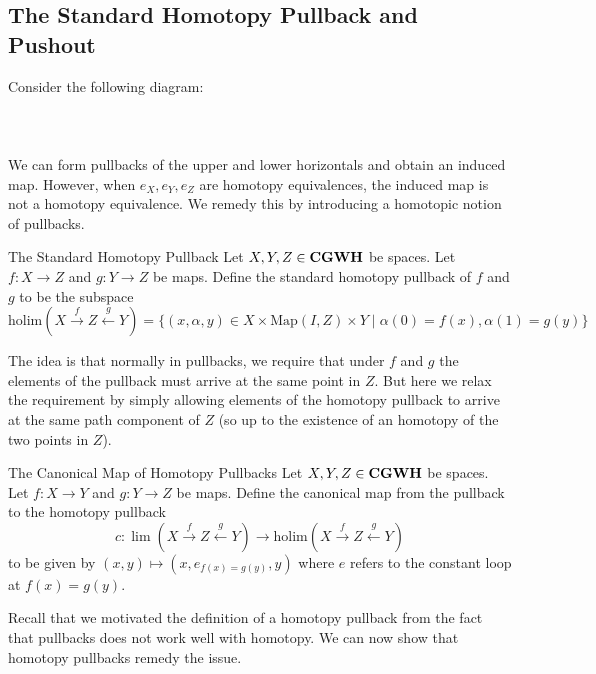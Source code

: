 \documentclass[a4paper]{article}
\begin{document}
\subsection{The Standard Homotopy Pullback and Pushout}
Consider the following diagram: \\~\\
\\~\\
We can form pullbacks of the upper and lower horizontals and obtain an induced map. However, when $e_X,e_Y,e_Z$ are homotopy equivalences, the induced map is not a homotopy equivalence. We remedy this by introducing a homotopic notion of pullbacks. 

\begin{defn}{The Standard Homotopy Pullback}{} Let $X,Y,Z\in\bold{CGWH}$ be spaces. Let $f:X\to Z$ and $g:Y\to Z$ be maps. Define the standard homotopy pullback of $f$ and $g$ to be the subspace $$\text{holim}(X\overset{f}{\rightarrow}Z\overset{g}{\leftarrow}Y)=\{(x,\alpha,y)\in X\times\text{Map}(I,Z)\times Y\;|\;\alpha(0)=f(x),\alpha(1)=g(y)\}$$
\end{defn}

The idea is that normally in pullbacks, we require that under $f$ and $g$ the elements of the pullback must arrive at the same point in $Z$. But here we relax the requirement by simply allowing elements of the homotopy pullback to arrive at the same path component of $Z$ (so up to the existence of an homotopy of the two points in $Z$). 

\begin{defn}{The Canonical Map of Homotopy Pullbacks}{} Let $X,Y,Z\in\bold{CGWH}$ be spaces. Let $f:X\to Y$ and $g:Y\to Z$ be maps. Define the canonical map from the pullback to the homotopy pullback $$c:\lim(X\overset{f}{\rightarrow}Z\overset{g}{\leftarrow}Y)\to\text{holim}(X\overset{f}{\rightarrow}Z\overset{g}{\leftarrow}Y)$$ to be given by $(x,y)\mapsto(x,e_{f(x)=g(y)},y)$ where $e$ refers to the constant loop at $f(x)=g(y)$. 
\end{defn}

Recall that we motivated the definition of a homotopy pullback from the fact that pullbacks does not work well with homotopy. We can now show that homotopy pullbacks remedy the issue. 
\end{document}
